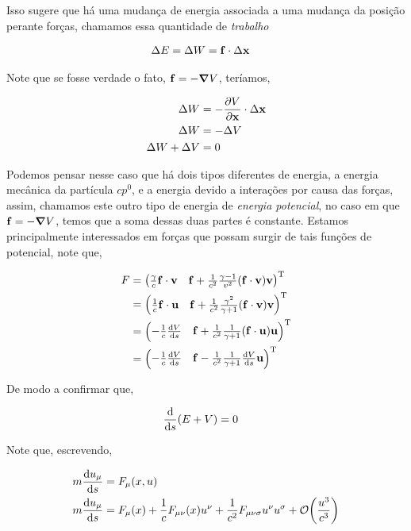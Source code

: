 \documentclass[twoside]{amsart}
\numberwithin{equation}{section}
\begin{document}
Isso sugere que há uma mudança de energia associada a uma mudança da posição perante forças, chamamos essa quantidade de \emph{trabalho}

\begin{align}
    \Delta E&=\Delta W=\vb f\cdot \Delta \vb x
\end{align}

Note que se fosse verdade o fato, $\vb f =-\grad V$, teríamos,

\begin{align}
    \Delta W&=-\pdv{V}{\vb x}\cdot \Delta \vb x\\
    \Delta W&=-\Delta V\\
    \Delta W+\Delta V&=0
\end{align}

Podemos pensar nesse caso que há dois tipos diferentes de energia, a energia mecânica da partícula $cp^0$, e a energia devido a interações por causa das forças, assim, chamamos este outro tipo de energia de \emph{energia potencial}, no caso em que $\vb f=-\grad V$, temos que a soma dessas duas partes é constante. Estamos principalmente interessados em forças que possam surgir de tais funções de potencial, note que,

\begin{align}
    F&=\mqty(\frac\gamma c\vb f\cdot \vb v&\vb f+\frac{1}{c^2}\frac{\gamma -1}{v^2}\qty(\vb f\cdot \vb v)\vb v)^{\textup T}\\
    &=\mqty(\frac1c\vb f\cdot \vb u&\vb f+\frac{1}{c^2}\frac{\gamma^2}{\gamma+1}\qty(\vb f\cdot \vb v)\vb v)^{\textup T}\\
    &=\mqty(-\frac1c\dv{V}{s}&\vb f+\frac{1}{c^2}\frac{1}{\gamma+1}\qty(\vb f\cdot\vb u)\vb u)^{\textup T}\\
    &=\mqty(-\frac1c\dv{V}{s}&\vb f-\frac{1}{c^2}\frac{1}{\gamma+1}\dv{V}{s}\vb u)^{\textup T}
\end{align}

De modo a confirmar que,

\begin{align}
    \dv{}{s}\qty(E+V)&=0
\end{align}

Note que, escrevendo,

\begin{align}
    m\dv{u_\mu}{s}&=F_{\mu}\qty(x,u)\\
    m\dv{u_\mu}{s}&=F_{\mu}\qty(x)+\frac1cF_{\mu \nu}\qty(x)u^\nu+\frac{1}{c^2}F_{\mu\nu\sigma}u^\nu u^\sigma+\mathcal O\qty(\frac{u^3}{c^3})
\end{align}
\end{document}
